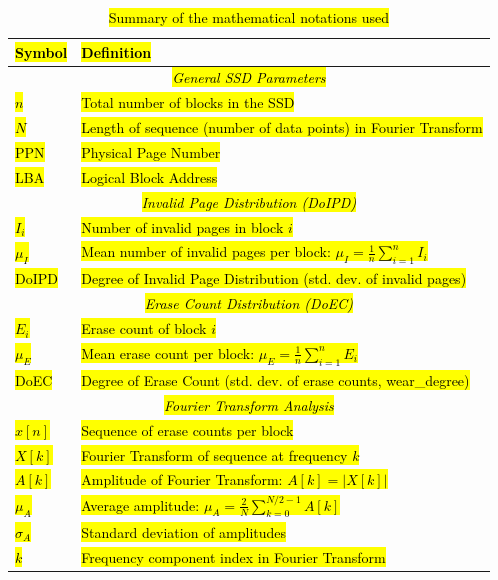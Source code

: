 \documentclass{ieeeaccess}
\begin{document}
\begin{table}[h]
    \centering
    \caption{\hl{Summary of the mathematical notations used}}
    \label{table:math_notations}
    \begin{tabular}{|p{1.5cm}|p{6cm}|}
        \hline
        \textbf{\hl{Symbol}} & \textbf{\hl{Definition}} \\
        \hline
        \multicolumn{2}{|c|}{\textit{\hl{General SSD Parameters}}} \\
        \hline
        \hl{$n$} & \hl{Total number of blocks in the SSD} \\
        \hline
        \hl{$N$} & \hl{Length of sequence (number of data points) in Fourier Transform} \\
        \hline
        \hl{PPN} & \hl{Physical Page Number} \\
        \hline
        \hl{LBA} & \hl{Logical Block Address} \\
        \hline
        \multicolumn{2}{|c|}{\textit{\hl{Invalid Page Distribution (DoIPD)}}} \\
        \hline
        \hl{$I_i$} & \hl{Number of invalid pages in block $i$} \\
        \hline
        \hl{$\mu_I$} & \hl{Mean number of invalid pages per block: $\mu_I = \frac{1}{n}\sum_{i=1}^{n} I_i$} \\
        \hline
        \hl{DoIPD} & \hl{Degree of Invalid Page Distribution (std. dev. of invalid pages)} \\
        \hline
        \multicolumn{2}{|c|}{\textit{\hl{Erase Count Distribution (DoEC)}}} \\
        \hline
        \hl{$E_i$} & \hl{Erase count of block $i$} \\
        \hline
        \hl{$\mu_E$} & \hl{Mean erase count per block: $\mu_E = \frac{1}{n}\sum_{i=1}^{n} E_i$} \\
        \hline
        \hl{DoEC} & \hl{Degree of Erase Count (std. dev. of erase counts, wear\_degree)} \\
        \hline
        \multicolumn{2}{|c|}{\textit{\hl{Fourier Transform Analysis}}} \\
        \hline
        \hl{$x[n]$} & \hl{Sequence of erase counts per block} \\
        \hline
        \hl{$X[k]$} & \hl{Fourier Transform of sequence at frequency $k$} \\
        \hline
        \hl{$A[k]$} & \hl{Amplitude of Fourier Transform: $A[k] = |X[k]|$} \\
        \hline
        \hl{$\mu_A$} & \hl{Average amplitude: $\mu_A = \frac{2}{N}\sum_{k=0}^{N/2-1} A[k]$} \\
        \hline
        \hl{$\sigma_A$} & \hl{Standard deviation of amplitudes} \\
        \hline
        \hl{$k$} & \hl{Frequency component index in Fourier Transform} \\
        \hline
    \end{tabular}
\end{table}
\end{document}
